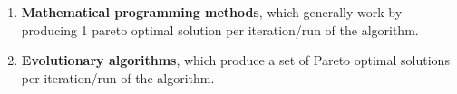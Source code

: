 \begin{enumerate}
    \item \textbf{Mathematical programming methods}, which generally work by producing 1 pareto optimal solution per iteration/run of the algorithm.
    \item \textbf{Evolutionary algorithms}, which produce a set of Pareto optimal solutions per iteration/run of the algorithm.
\end{enumerate}

